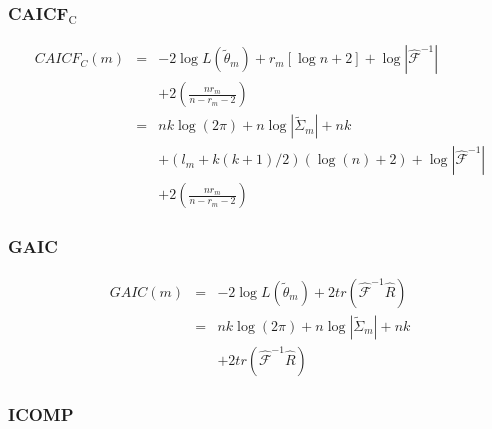 \subsubsection{CAICF$_{\text{C}}$}

\begin{eqnarray*}
CAICF_{C}\left(m\right) & = & -2\log L\left(\widetilde{\theta}_{m}\right)+r_{m}\left[\log n+2\right]+\log\left\vert \hat{\mathcal{F}}^{-1}\right\vert \\
 &  & +2\left(\frac{nr_{m}}{n-r_{m}-2}\right)\\
 & = & nk\log\left(2\pi\right)+n\log\left\vert \widetilde{\Sigma}_{m}\right\vert +nk\\
 &  & +\left(l_{m}+k\left(k+1\right)/2\right)\left(\log\left(n\right)+2\right)+\log\left\vert \hat{\mathcal{F}}^{-1}\right\vert \\
 &  & +2\left(\frac{nr_{m}}{n-r_{m}-2}\right)
\end{eqnarray*}



\subsubsection{GAIC}

\begin{eqnarray*}
GAIC\left(m\right) & = & -2\log L\left(\widetilde{\theta}_{m}\right)+2tr\left(\hat{\mathcal{F}}^{-1}\hat{R}\right)\\
 & = & nk\log\left(2\pi\right)+n\log\left\vert \widetilde{\Sigma}_{m}\right\vert +nk\\
 &  & +2tr\left(\hat{\mathcal{F}}^{-1}\hat{R}\right)
\end{eqnarray*}



\subsubsection{ICOMP}

